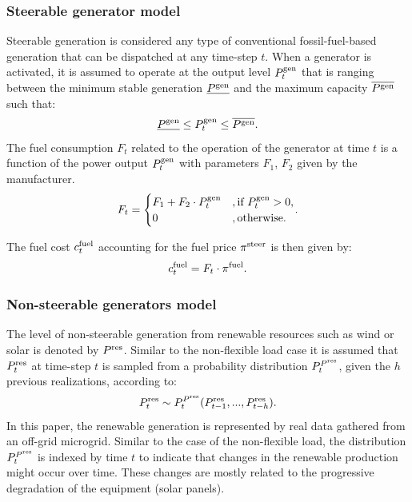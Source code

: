 \documentclass{article}
\begin{document}
\subsubsection{Steerable generator model}
    Steerable generation is considered any type of conventional fossil-fuel-based generation that can be dispatched at any time-step $t$. When a generator is activated, it is assumed to operate at the output level $P^\text{gen}_t$ that is ranging between the minimum stable generation $\underline{P^\text{gen}}$ and the maximum capacity $\overline{P^\text{gen}}$ such that:
    \begin{gather}
    \underline{P^\text{gen}} \leq P^\text{gen}_t \leq \overline{P^\text{gen}}.\label{eqn: generatordynamics}
    \end{gather}
    The fuel consumption $F_t$ related to the operation of the generator at time $t$ is a function of the power output $P^\text{gen}_t$ with parameters $F_1$, $F_2$ given by the manufacturer. 
    \begin{gather}
    \begin{split}
    F_t =  
    \begin{cases}
    F_1 + F_2 \cdot P^\text{gen}_t &, \text{if } P^\text{gen}_t>0,   \\
    0  &, \text{otherwise}.
    \end{cases}
    \end{split}.\label{eqn: fuelconsuption}
    \end{gather}
    
    
    The fuel cost $c^\text{fuel}_t$ accounting for the fuel price $\pi^{\text{steer}}$ is then given by:
    \begin{gather}
    c^\text{fuel}_t = F_t \cdot \pi^{\text{fuel}} .\label{eqn: generatorcost}
    \end{gather}
    
\subsubsection{Non-steerable generators model}
    The level of non-steerable generation from renewable resources such as wind or solar is denoted by $P^\text{res}$. Similar to the non-flexible load case it is assumed that $P^\text{res}_t$ at time-step $t$ is sampled from a probability distribution $P^{P^\text{res}}_{t}$, given the $h$ previous realizations, according to:
    \begin{gather}
    P^\text{res}_t \sim P^{P^\text{res}}_{t}( P^\text{res}_{t-1},...,P^\text{res}_{t-h}).\label{eqn: pv}
    \end{gather}
    In this paper, the renewable generation is represented by real data gathered from an off-grid microgrid. Similar to the case of the non-flexible load, the distribution $P^{P^\text{res}}_{t}$ is indexed by time $t$ to indicate that changes in the renewable production might occur over time. These changes are mostly related to the progressive degradation of the equipment (solar panels).
    
\end{document}
